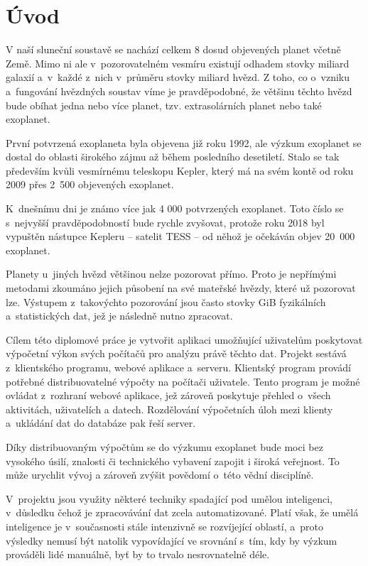 \documentclass[a4paper,12pt]{article}
\begin{document}
\section*{Úvod}
\label{uvod}

V naší sluneční soustavě se nachází celkem 8 dosud objevených planet včetně Země. Mimo ni ale v~pozorovatelném vesmíru existují odhadem stovky miliard galaxií a~v~každé z~nich v~průměru stovky miliard hvězd. Z toho, co o~vzniku a~fungování hvězdných soustav víme je pravděpodobné, že většinu těchto hvězd bude obíhat jedna nebo více planet, tzv. extrasolárních planet nebo také exoplanet.~\cite{exoplanets}

První potvrzená exoplaneta byla objevena již roku 1992, ale výzkum exoplanet se dostal do oblasti širokého zájmu až během posledního desetiletí. Stalo se tak především kvůli vesmírnému teleskopu Kepler, který má na svém kontě od roku 2009 přes 2~500 objevených exoplanet.~\cite{kepler80,nasadata}

K~dnešnímu dni je známo více jak 4 000 potvrzených exoplanet. Toto číslo se s~nejvyšší pravděpodobností bude rychle zvyšovat, protože roku 2018 byl vypuštěn nástupce Kepleru -- satelit TESS -- od něhož je očekáván objev 20~000 exoplanet.~\cite{tess}

Planety u~jiných hvězd většinou nelze pozorovat přímo. Proto je nepřímými metodami zkoumáno jejich působení na své mateřské hvězdy, které už pozorovat lze. Výstupem z~takovýchto pozorování jsou často stovky GiB fyzikálních a~statistických dat, jež je následně nutno zpracovat.~\cite{exoplanets}

Cílem této diplomové práce je vytvořit aplikaci umožňující uživatelům poskytovat výpočetní výkon svých počítačů pro analýzu právě těchto dat. Projekt sestává z~klientského programu, webové aplikace a~serveru. Klientský program provádí potřebné distribuovatelné výpočty na počítači uživatele. Tento program je možné ovládat z~rozhraní webové aplikace, jež zároveň poskytuje přehled o~všech aktivitách, uživatelích a datech. Rozdělování výpočetních úloh mezi klienty a~ukládání dat do databáze pak řeší server.

Díky distribuovaným výpočtům se do výzkumu exoplanet bude moci bez vysokého úsilí, znalosti či technického vybavení zapojit i široká veřejnost. To může urychlit vývoj a zároveň zvýšit povědomí o~této vědní disciplíně.

V~projektu jsou využity některé techniky spadající pod umělou inteligenci, v~důsledku čehož je zpracovávání dat zcela automatizované. Platí však, že umělá inteligence je v~současnosti stále intenzivně se rozvíjející oblastí, a~proto výsledky nemusí být natolik vypovídající ve srovnání s~tím, kdy by výzkum prováděli lidé manuálně, byť by to trvalo nesrovnatelně déle.
\end{document}
